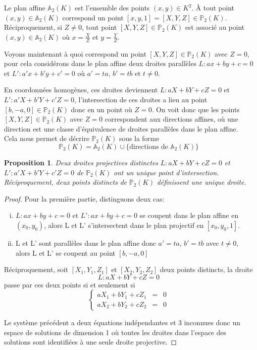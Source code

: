 \documentclass{article}
\newtheorem{proposition}{Proposition}
\begin{document}
Le plan affine $\mathbb{A}_{2}(K)$ est l'ensemble des points $(x,y)\in K^{2}$. À tout point 
$(x,y)\in \mathbb{A}_{2}(K)$ correspond un point $[x,y,1]=[X,Y,Z] \in \mathbb{P}_{2}(K)$.
Réciproquement, si $Z \neq 0$, tout point $[X,Y,Z]\in \mathbb{P}_{2}(K)$ est associé au point
$(x,y)\in \mathbb{A}_{2}(K)$ où $x=\frac{X}{Z}$ et $y=\frac{Y}{Z}$.

Voyons maintenant à quoi correspond un point $[X,Y,Z]\in \mathbb{P}_{2}(K)$ avec $Z=0$, pour cela considérons
dans le plan affine deux droites parallèles $L: ax+by+c=0$ et $L': a'x+b'y+c'=0$ où $a'=ta$, $b'=tb$ et $t\neq 0$.

En coordonnées homogènes, ces droites deviennent $L: aX+bY+cZ=0$ et $L': a'X+b'Y+c'Z=0$, l'intersection de ces
droites a lieu au point $[b, -a, 0] \in \mathbb{P}_{2}(K)$ donc en un point où $Z=0$.
On voit donc que les points $[X,Y,Z]\in \mathbb{P}_{2}(K)$ avec $Z=0$ correspondent aux directions affines,
où une direction est une classe d'équivalence de droites parallèles dans le plan affine.
Cela nous permet de décrire $\mathbb{P}_{2}(K)$ sous la forme
\begin{equation*}
\mathbb{P}_{2}(K) = \mathbb{A}_{2}(K) \cup \{\text{directions de }\mathbb{A}_{2}(K)\}
\end{equation*}

\begin{proposition}
Deux droites projectives distinctes $L: aX+bY+cZ=0$ et $L': a'X+b'Y+c'Z=0$ de $\mathbb{P}_{2}(K)$ ont un unique point d'intersection.
Réciproquement, deux points distincts de $\mathbb{P}_{2}(K)$ définissent une unique droite.
\end{proposition}

\begin{proof}
Pour la première partie, distinguons deux cas:
\begin{enumerate}[(i)]
\item $L: ax+by+c=0$ et $L': ax+by+c=0$ se coupent dans le plan affine en $(x_{0}, y_{0})$, alors
L et L' s'intersectent dans le plan projectif en $[x_{0}, y_{0}, 1]$.
\item L et L' sont parallèles dans le plan affine donc $a'=ta$, $b'=tb$ avec $t\neq 0$, alors
L et L' se coupent au point $[b, -a, 0]$
\end{enumerate}

Réciproquement, soit $[X_{1}, Y_{1}, Z_{1}]$ et $[X_{2}, Y_{2}, Z_{2}]$ deux points distincts, la droite $$L: aX+bY+cZ=0$$ passe par ces deux points si et seulement si
\begin{equation*}
\left\lbrace
\begin{array}{lcl}
aX_{1}+bY_{1}+cZ_{1} &=& 0\\
aX_{2}+bY_{2}+cZ_{2} &=& 0
\end{array}\right.
\end{equation*}

Le système précédent a deux équations indépendantes et 3 inconnues donc un espace de solutions de dimension 1
où toutes les droites dans l'espace des solutions sont identifiées à une seule droite projective.
\end{proof}
\end{document}
